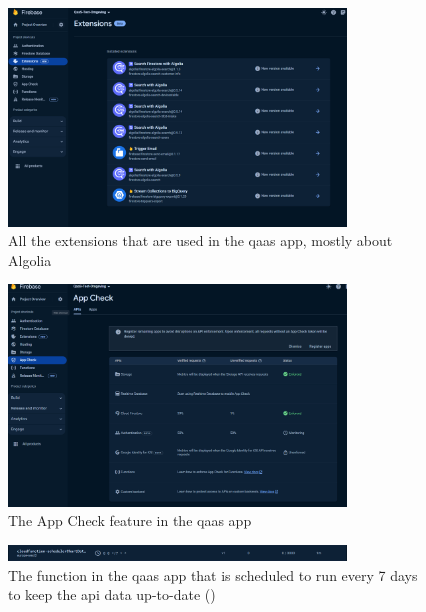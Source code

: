 \begin{figure}[htbp]
      \centering
      \includegraphics[width=0.8\textwidth]{Figures/Firebase/Extensions.png}
      \caption{All the extensions that are used in the \acrshort{qaas} app, mostly about Algolia}
\end{figure}

\begin{figure}[htbp]
      \centering
      \includegraphics[width=0.8\textwidth]{Figures/Firebase/App Check.png}
      \caption{The App Check feature in the \acrshort{qaas} app}
\end{figure}

\begin{figure}[htbp]
      \centering
      \includegraphics[width=0.8\textwidth]{Figures/Firebase/Functions/CronJobs.png}
      \caption{The function in the \acrshort{qaas} app that is scheduled to run every 7 days to keep the \acrshort{api} data up-to-date
            (\textit{\cite{cronJobQaaSAppFunction}})}
\end{figure}

